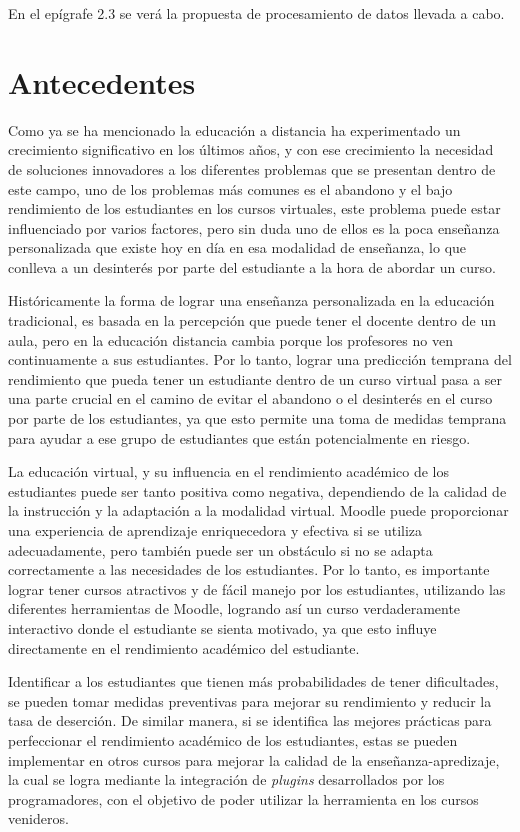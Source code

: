 En el epígrafe 2.3 se verá la propuesta de procesamiento de datos llevada a cabo.  

\section{Antecedentes}

Como ya se ha mencionado la educación a distancia ha experimentado un crecimiento significativo en los últimos años, y con ese crecimiento la necesidad de soluciones innovadores a los diferentes problemas que se presentan dentro de este campo, uno de los problemas más comunes es el abandono y el bajo rendimiento de los estudiantes en los cursos virtuales, este problema puede estar influenciado por varios factores, pero sin duda uno de ellos es la poca enseñanza personalizada que existe hoy en día en esa modalidad de enseñanza, lo que conlleva a un desinterés por parte del estudiante a la hora de abordar un curso.  


Históricamente la forma de lograr una enseñanza personalizada en la educación tradicional, es basada en la percepción que puede tener el docente dentro de un aula, pero en la educación distancia cambia porque los profesores no ven continuamente a sus estudiantes. Por lo tanto, lograr una predicción temprana del rendimiento que pueda tener un estudiante dentro de un curso virtual pasa a ser una parte crucial en el camino de evitar el abandono o el desinterés en el curso por parte de los estudiantes, ya que esto permite una toma de medidas temprana para ayudar a ese grupo de estudiantes que están potencialmente en riesgo.  

 
La educación virtual, y su influencia en el rendimiento académico de los estudiantes puede ser tanto positiva como negativa, dependiendo de la calidad de la instrucción y la adaptación a la modalidad virtual. Moodle puede proporcionar una experiencia de aprendizaje enriquecedora y efectiva si se utiliza adecuadamente, pero también puede ser un obstáculo si no se adapta correctamente a las necesidades de los estudiantes. Por lo tanto, es importante lograr tener cursos atractivos y de fácil manejo por los estudiantes, utilizando las diferentes herramientas de Moodle, logrando así un curso verdaderamente interactivo donde el estudiante se sienta motivado, ya que esto influye directamente en el rendimiento académico del estudiante.  


Identificar a los estudiantes que tienen más probabilidades de tener dificultades, se pueden tomar medidas preventivas para mejorar su rendimiento y reducir la tasa de deserción. De similar manera, si se identifica las mejores prácticas para perfeccionar el rendimiento académico de los estudiantes, estas se pueden implementar en otros cursos para mejorar la calidad de la enseñanza-apredizaje, la cual se logra mediante la integración de \textit{plugins} desarrollados por los programadores, con el objetivo de poder utilizar la herramienta en los cursos venideros.  

